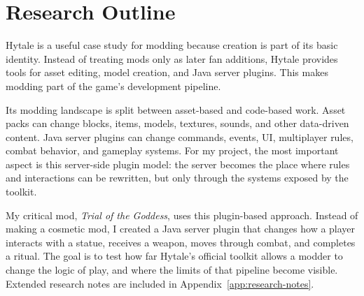 \section{Research Outline}

Hytale is a useful case study for modding because creation is part of its basic identity.
Instead of treating mods only as later fan additions,
Hytale provides tools for asset editing,
model creation,
and Java server plugins.
This makes modding part of the game's development pipeline.

Its modding landscape is split between asset-based and code-based work.
Asset packs can change blocks,
items,
models,
textures,
sounds,
and other data-driven content.
Java server plugins can change commands,
events,
UI,
multiplayer rules,
combat behavior,
and gameplay systems.
For my project,
the most important aspect is this server-side plugin model:
the server becomes the place where rules and interactions can be rewritten,
but only through the systems exposed by the toolkit.

My critical mod,
\textit{Trial of the Goddess},
uses this plugin-based approach.
Instead of making a cosmetic mod,
I created a Java server plugin that changes how a player interacts with a statue,
receives a weapon,
moves through combat,
and completes a ritual.
The goal is to test how far Hytale's official toolkit allows a modder to change
the logic of play,
and where the limits of that pipeline become visible.
Extended research notes are included in Appendix~\ref{app:research-notes}.
